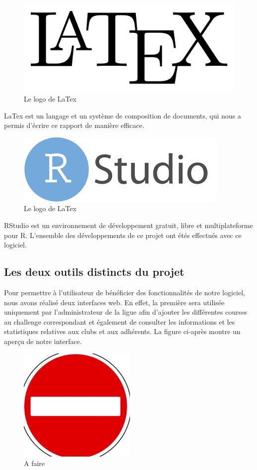 \documentclass[12pt,a4paper]{report}
\begin{document}
\begin{figure}[!h]
	\center
	\includegraphics[scale=0.1]{img/latex.png}
	\caption {Le logo de LaTex}
\end{figure}

LaTex est un langage et un système de composition de documents, qui nous a permis d'écrire ce rapport de manière efficace.

\begin{figure}[!h]
	\center
	\includegraphics[scale=0.2]{img/rstudio.png}
	\caption {Le logo de LaTex}
\end{figure}

RStudio est un environnement de développement gratuit, libre et multiplateforme pour R.
L'ensemble des développements de ce projet ont étés effectués avec ce logiciel.



\subsection {Les deux outils distincts du projet}
Pour permettre à l’utilisateur de bénéficier des fonctionnalités de notre logiciel, nous avons réalisé deux interfaces web. En effet, la première sera utilisée uniquement par l’administrateur de la ligue afin d’ajouter les différentes courses au challenge correspondant et également de consulter les informations et les statistiques relatives aux clubs et aux adhérents.
La figure ci-après montre un aperçu de notre interface. 

\begin{figure}
	  \center
	  \includegraphics[scale=0.5]{img/A_faire.png}
	   \caption {A faire }
\end{figure}
\end{document}
